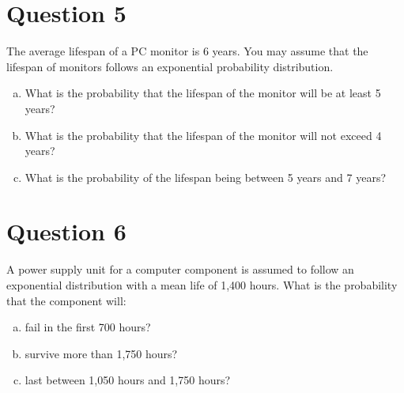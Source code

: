 \section*{Question 5}
The average lifespan of a PC monitor is 6 years. You may assume that the lifespan of monitors
follows an exponential probability distribution.
\begin{enumerate}[(a)]
    \item  What is the probability that the lifespan of the monitor will be at least 5 years?
\item What is the probability that the lifespan of the monitor will not exceed 4 years?
\item  What is the probability of the lifespan being between 5 years and 7 years?
\end{enumerate}


\section*{Question 6}
A power supply unit for a computer component is assumed to follow an
exponential distribution with a mean life of 1,400 hours. What is the
probability that the component will:

\begin{enumerate}[(a)]
\item  fail in the first 700 hours?
\item  survive more than 1,750 hours?
\item  last between 1,050 hours and 1,750 hours?
\end{enumerate}




